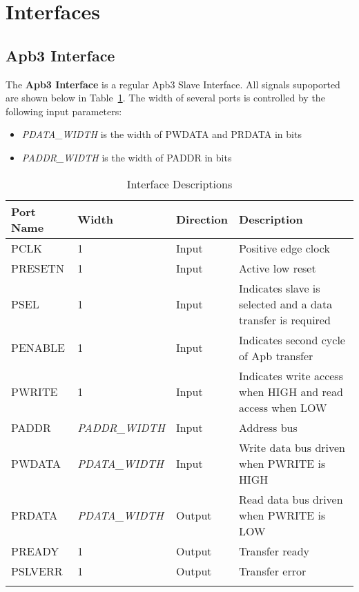 \section{Interfaces}

\subsection{Apb3 Interface}
The \textbf{Apb3 Interface} is a regular Apb3 Slave Interface. All signals supoported are shown below in 
Table~\ref{table:interface}. The width of several ports is controlled 
by the following input parameters:

\begin{itemize}[noitemsep]
  \item \textit{PDATA_WIDTH} is the width of PWDATA and PRDATA in bits
  \item \textit{PADDR_WIDTH} is the width of PADDR in bits
\end{itemize}
 
\renewcommand*{\arraystretch}{1.4}
\begin{longtable}[H]{
  | p{}
  | p{}
  | p{}
  | p{} |
  }
  \hline
  \textbf{Port Name} &   
  \textbf{Width} &   
  \textbf{Direction} &   
  \textbf{Description} \\ \hline \hline

  PCLK &       
  1 &       
  Input &       
  Positive edge clock \\ \hline

  PRESETN &       
  1 &       
  Input &       
  Active low reset \\ \hline

  PSEL &       
  1 & 
  Input &       
  Indicates slave is selected and a data transfer is required \\ \hline

  PENABLE &        
  1 & 
  Input &       
  Indicates second cycle of Apb transfer \\ \hline

  PWRITE &        
  1 & 
  Input &       
  Indicates write access when HIGH and read access when LOW\\ \hline

  PADDR &      
  \textit{PADDR_WIDTH} & 
  Input &     
  Address bus \\ \hline

  PWDATA &      
  \textit{PDATA_WIDTH} & 
  Input &     
  Write data bus driven when PWRITE is HIGH\\ \hline

  PRDATA &      
  \textit{PDATA_WIDTH} & 
  Output &     
  Read data bus driven when PWRITE is LOW\\ \hline
 
  PREADY &        
  1 & 
  Output &       
  Transfer ready \\ \hline

  PSLVERR &        
  1 & 
  Output &       
  Transfer error \\ \hline

  \caption{Interface Descriptions}\label{table:interface}
\end{longtable}
